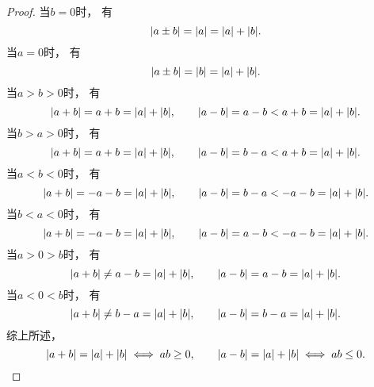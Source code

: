 \begin{theorem}[三角不等式I]
\begin{proof}
当\(b=0\)时，
有\begin{equation*}
	\abs{a \pm b} = \abs{a} = \abs{a} + \abs{b}.
\end{equation*}
当\(a=0\)时，
有\begin{equation*}
	\abs{a \pm b} = \abs{b} = \abs{a} + \abs{b}.
\end{equation*}
当\(a>b>0\)时，
有\begin{equation*}
	\abs{a + b} = a + b = \abs{a} + \abs{b}, \qquad
	\abs{a - b} = a - b < a + b = \abs{a} + \abs{b}.
\end{equation*}
当\(b>a>0\)时，
有\begin{equation*}
	\abs{a + b} = a + b = \abs{a} + \abs{b}, \qquad
	\abs{a - b} = b - a < a + b = \abs{a} + \abs{b}.
\end{equation*}
当\(a<b<0\)时，
有\begin{equation*}
	\abs{a + b} = -a-b = \abs{a} + \abs{b}, \qquad
	\abs{a - b} = b-a < -a-b = \abs{a} + \abs{b}.
\end{equation*}
当\(b<a<0\)时，
有\begin{equation*}
	\abs{a + b} = -a-b = \abs{a} + \abs{b}, \qquad
	\abs{a - b} = a-b < -a-b = \abs{a} + \abs{b}.
\end{equation*}
当\(a>0>b\)时，
有\begin{equation*}
	\abs{a + b} \neq a - b = \abs{a} + \abs{b}, \qquad
	\abs{a - b} = a - b = \abs{a} + \abs{b}.
\end{equation*}
当\(a<0<b\)时，
有\begin{equation*}
	\abs{a + b} \neq b - a = \abs{a} + \abs{b}, \qquad
	\abs{a - b} = b - a = \abs{a} + \abs{b}.
\end{equation*}
综上所述，\begin{equation*}
	\abs{a + b} = \abs{a} + \abs{b} \iff ab \geq 0, \qquad
	\abs{a - b} = \abs{a} + \abs{b} \iff ab \leq 0.
	\qedhere
\end{equation*}
\end{proof}
\end{theorem}

